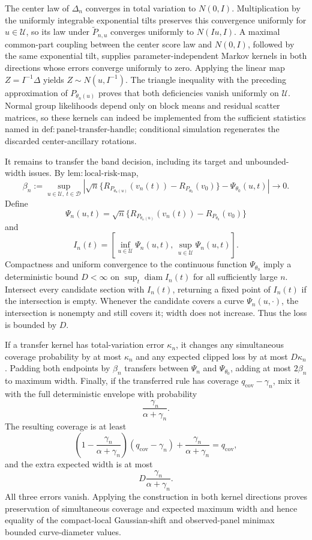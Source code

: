 The center law of \(\Delta_n\) converges in total variation to \(N(0,I)\).  Multiplication by the uniformly integrable exponential tilts preserves this convergence uniformly for \(u\in\mathcal U\), so its law under \(\widetilde P_{n,u}\) converges uniformly to \(N(Iu,I)\).  A maximal common-part coupling between the center score law and \(N(0,I)\), followed by the same exponential tilt, supplies parameter-independent Markov kernels in both directions whose errors converge uniformly to zero.  Applying the linear map \(Z=I^{-1}\Delta\) yields \(Z\sim N(u,I^{-1})\).  The triangle inequality with the preceding approximation of \(P_{\theta_n(u)}\) proves that both deficiencies vanish uniformly on \(\mathcal U\).  Normal group likelihoods depend only on block means and residual scatter matrices, so these kernels can indeed be implemented from the sufficient statistics named in \(\mathrm{def:panel\mbox{-}transfer\mbox{-}handle}\); conditional simulation regenerates the discarded center-ancillary rotations.

It remains to transfer the band decision, including its target and unbounded-width issues.  By \(\mathrm{lem:local\mbox{-}risk\mbox{-}map}\),
\[
\beta_n:=
\sup_{u\in\mathcal U,\ t\in\mathcal D}
\left|
\sqrt n\{R_{P_{\theta_n(u)}}(v_n(t))
-R_{P_{\theta_0}}(v_0)\}
-\Psi_{\theta_0}(u,t)
\right|
\longrightarrow0.
\]
Define
\[
\Psi_n(u,t)=
\sqrt n\{R_{P_{\theta_n(u)}}(v_n(t))
-R_{P_{\theta_0}}(v_0)\}
\]
and
\[
I_n(t)=
\left[
\inf_{u\in\mathcal U}\Psi_n(u,t),\,
\sup_{u\in\mathcal U}\Psi_n(u,t)
\right].
\]
Compactness and uniform convergence to the continuous function \(\Psi_{\theta_0}\) imply a deterministic bound \(D<\infty\) on
\(\sup_t\operatorname{diam}I_n(t)\) for all sufficiently large \(n\).  Intersect every candidate section with \(I_n(t)\), returning a fixed point of \(I_n(t)\) if the intersection is empty.  Whenever the candidate covers a curve \(\Psi_n(u,\cdot)\), the intersection is nonempty and still covers it; width does not increase.  Thus the loss is bounded by \(D\).

If a transfer kernel has total-variation error \(\kappa_n\), it changes any simultaneous coverage probability by at most \(\kappa_n\) and any expected clipped loss by at most \(D\kappa_n\).  Padding both endpoints by \(\beta_n\) transfers between \(\Psi_n\) and \(\Psi_{\theta_0}\), adding at most \(2\beta_n\) to maximum width.  Finally, if the transferred rule has coverage \(q_{\mathrm{cov}}-\gamma_n\), mix it with the full deterministic envelope with probability
\[
\frac{\gamma_n}{\alpha+\gamma_n}.
\]
The resulting coverage is at least
\[
\left(1-\frac{\gamma_n}{\alpha+\gamma_n}\right)
(q_{\mathrm{cov}}-\gamma_n)
+\frac{\gamma_n}{\alpha+\gamma_n}
=q_{\mathrm{cov}},
\]
and the extra expected width is at most
\[
D\frac{\gamma_n}{\alpha+\gamma_n}.
\]
All three errors vanish.  Applying the construction in both kernel directions proves preservation of simultaneous coverage and expected maximum width and hence equality of the compact-local Gaussian-shift and observed-panel minimax bounded curve-diameter values.

